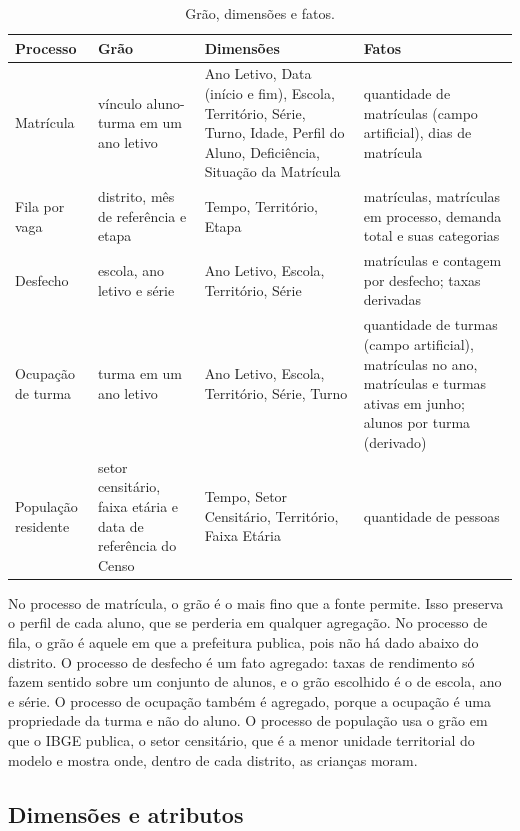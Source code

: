 \documentclass[11pt,a4paper]{article}
\begin{document}
\begin{table}[H]
\centering\small
\begin{tabularx}{\linewidth}{>{\raggedright}p{2.2cm}>{\raggedright}p{3.3cm}X>{\raggedright\arraybackslash}p{3.6cm}}
\toprule
\textbf{Processo} & \textbf{Grão} & \textbf{Dimensões} & \textbf{Fatos} \\
\midrule
Matrícula & vínculo aluno-turma em um ano letivo & Ano Letivo, Data (início e fim), Escola, Território, Série, Turno, Idade, Perfil do Aluno, Deficiência, Situação da Matrícula & quantidade de matrículas (campo artificial), dias de matrícula \\
Fila por vaga & distrito, mês de referência e etapa & Tempo, Território, Etapa & matrículas, matrículas em processo, demanda total e suas categorias \\
Desfecho & escola, ano letivo e série & Ano Letivo, Escola, Território, Série & matrículas e contagem por desfecho; taxas derivadas \\
Ocupação de turma & turma em um ano letivo & Ano Letivo, Escola, Território, Série, Turno & quantidade de turmas (campo artificial), matrículas no ano, matrículas e turmas ativas em junho; alunos por turma (derivado) \\
População residente & setor censitário, faixa etária e data de referência do Censo & Tempo, Setor Censitário, Território, Faixa Etária & quantidade de pessoas \\
\bottomrule
\end{tabularx}
\caption{Grão, dimensões e fatos.}
\end{table}

No processo de matrícula, o grão é o mais fino que a fonte permite. Isso preserva o perfil de cada aluno, que se perderia em qualquer agregação. No processo de fila, o grão é aquele em que a prefeitura publica, pois não há dado abaixo do distrito. O processo de desfecho é um fato agregado: taxas de rendimento só fazem sentido sobre um conjunto de alunos, e o grão escolhido é o de escola, ano e série. O processo de ocupação também é agregado, porque a ocupação é uma propriedade da turma e não do aluno. O processo de população usa o grão em que o IBGE publica, o setor censitário, que é a menor unidade territorial do modelo e mostra onde, dentro de cada distrito, as crianças moram.

\subsection{Dimensões e atributos}
\label{sec:dimensoes}
\end{document}
